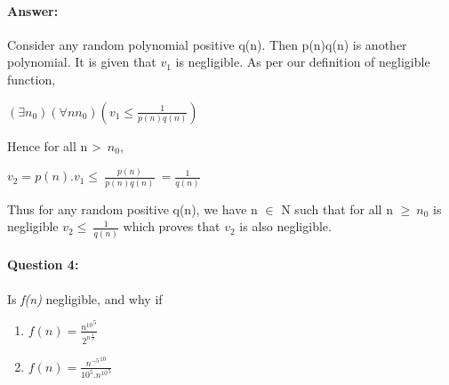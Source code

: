 \documentclass{article}
\begin{document}
    \paragraph{Answer: \newline}
        Consider any random polynomial positive q(n). Then p(n)q(n) is another polynomial. It is given that \emph{$v_1$} is negligible. As per our definition of negligible function,
        \begin{center}
            \begin{math}
                (\exists n_0)(\forall nn_0)(v_1\leq \frac{1}{p(n)q(n)})            
            \end{math}
        \end{center}
        Hence for all n \textgreater\ $n_0$,
        \begin{center}
            \begin{math}
                v_2 = p(n).v_1 \leq\ \frac{p(n)}{p(n)q(n)}\ = \frac{1}{q(n)}
            \end{math}
        \end{center}
        Thus for any random positive q(n), we have n $\in$ N such that for all n $\geq\ n_0$ is negligible $v_2 \leq\ \frac{1}{q(n)}$ which proves that $v_2$ is also negligible.
    \citep{section1question3}
    
    \paragraph{Question 4:} Is \emph{f(n)} negligible, and why if 
        \begin{enumerate}
            \item 
                \begin{math}
                    f(n) = \frac{{n^{10}}^5}{{2^n}^\frac{1}{2}}
                \end{math}
            \item
                \begin{math}
                    f(n) = \frac{{n^{-5}}^{10}}{{10^5}.{{n^{10}}^5}}
                \end{math}
        \end{enumerate}
        
\end{document}
